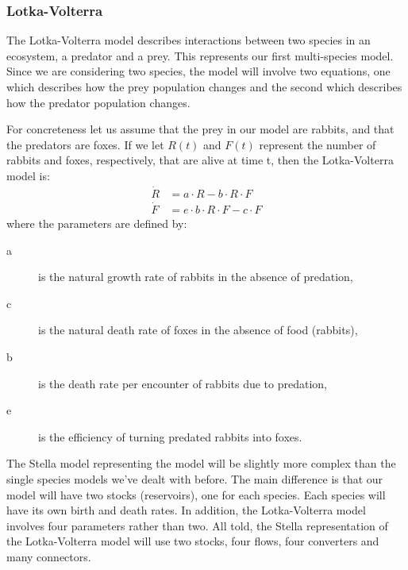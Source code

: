 \documentclass[11pt,english,BCOR=10mm,DIV=12,bibliography=totoc,parskip=false,headings=small,
    headinclude=false,footinclude=false,oneside]{pst-doc}
\begin{document}
\clearpage
\subsubsection{Lotka-Volterra}

The Lotka-Volterra model describes interactions between two species in an ecosystem, a 
predator and a prey. This represents our first multi-species model. Since we are considering 
two species, the model will involve two equations, one which describes how the prey 
population changes and the second which describes how the predator population changes.

For concreteness let us assume that the prey in our model are rabbits, and that the 
predators are foxes. If we let $R(t)$ and $F(t)$ represent the number of rabbits and 
foxes, respectively, that are alive at time t, then the Lotka-Volterra model is:
%
\begin{align}
\dot R &= a\cdot R - b\cdot R\cdot F\\
\dot F &= e\cdot b\cdot R\cdot F - c\cdot F
\end{align}
%
where the parameters are defined by:
\begin{description}
\item[a] is the natural growth rate of rabbits in the absence of predation,
\item[c] is the natural death rate of foxes in the absence of food (rabbits),
\item[b] is the death rate per encounter of rabbits due to predation,
\item[e] is the efficiency of turning predated rabbits into foxes.
\end{description}

The Stella model representing the  model will be slightly more complex than the 
single species models we've dealt with before. The main difference is that our model will have 
two stocks (reservoirs), one for each species. Each species will have its own birth and death 
rates. In addition, the Lotka-Volterra model involves four parameters rather than two. All told, 
the Stella representation of the Lotka-Volterra model will use two stocks, four flows, four 
converters and many connectors.
\end{document}
